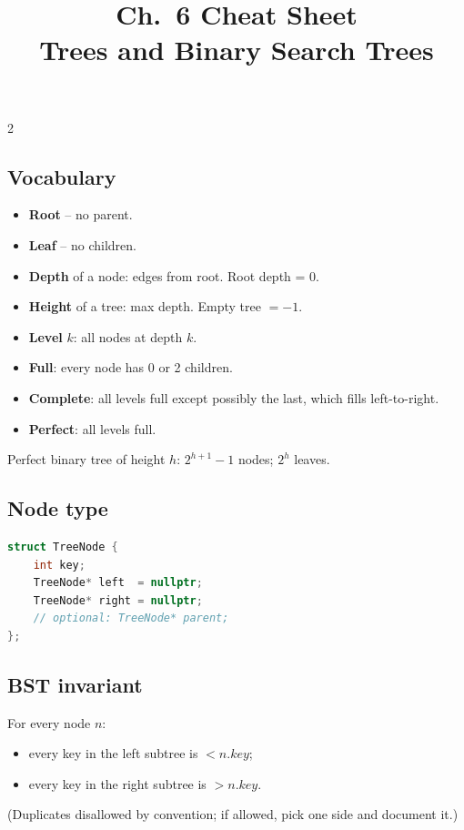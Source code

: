 \documentclass[10pt]{article}
\title{Ch.~6 Cheat Sheet\\\large Trees and Binary Search Trees}
\author{}
\date{}
\begin{document}
\maketitle
\vspace{-2em}

\begin{multicols}{2}

\subsection*{Vocabulary}
\begin{itemize}
    \item \textbf{Root} -- no parent.
    \item \textbf{Leaf} -- no children.
    \item \textbf{Depth} of a node: edges from root. Root depth = 0.
    \item \textbf{Height} of a tree: max depth. Empty tree $= -1$.
    \item \textbf{Level} $k$: all nodes at depth $k$.
    \item \textbf{Full}: every node has 0 or 2 children.
    \item \textbf{Complete}: all levels full except possibly the last,
    which fills left-to-right.
    \item \textbf{Perfect}: all levels full.
\end{itemize}
Perfect binary tree of height $h$: $2^{h+1} - 1$ nodes; $2^h$ leaves.

\subsection*{Node type}
\begin{lstlisting}[language=C++]
struct TreeNode {
    int key;
    TreeNode* left  = nullptr;
    TreeNode* right = nullptr;
    // optional: TreeNode* parent;
};
\end{lstlisting}

\subsection*{BST invariant}
For every node $n$:
\begin{itemize}
    \item every key in the left subtree is $< n.key$;
    \item every key in the right subtree is $> n.key$.
\end{itemize}
(Duplicates disallowed by convention; if allowed, pick one side and
document it.)


\end{multicols}
\end{document}
